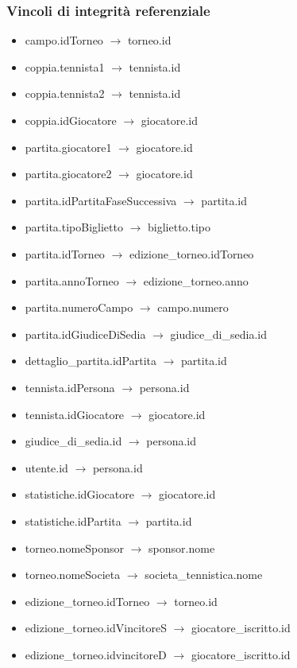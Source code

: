 \documentclass[10pt]{article}
\begin{document}
\subsubsection{Vincoli di integrità referenziale}
\begin{itemize}
    \item campo.idTorneo $\rightarrow$ torneo.id
    \item coppia.tennista1 $\rightarrow$ tennista.id
    \item coppia.tennista2 $\rightarrow$ tennista.id
    \item coppia.idGiocatore $\rightarrow$ giocatore.id
    \item partita.giocatore1 $\rightarrow$ giocatore.id
    \item partita.giocatore2 $\rightarrow$ giocatore.id
    \item partita.idPartitaFaseSuccessiva $\rightarrow$ partita.id
    \item partita.tipoBiglietto $\rightarrow$ biglietto.tipo
    \item partita.idTorneo $\rightarrow$ edizione\_torneo.idTorneo
    \item partita.annoTorneo $\rightarrow$ edizione\_torneo.anno
    \item partita.numeroCampo $\rightarrow$ campo.numero
    \item partita.idGiudiceDiSedia $\rightarrow$ giudice\_di\_sedia.id
    \item dettaglio\_partita.idPartita $\rightarrow$ partita.id
    \item tennista.idPersona $\rightarrow$ persona.id
    \item tennista.idGiocatore $\rightarrow$ giocatore.id
    \item giudice\_di\_sedia.id $\rightarrow$ persona.id
    \item utente.id $\rightarrow$ persona.id
    \item statistiche.idGiocatore $\rightarrow$ giocatore.id
    \item statistiche.idPartita $\rightarrow$ partita.id
    \item torneo.nomeSponsor $\rightarrow$ sponsor.nome
    \item torneo.nomeSocieta $\rightarrow$ societa\_tennistica.nome
    \item edizione\_torneo.idTorneo $\rightarrow$ torneo.id
    \item edizione\_torneo.idVincitoreS $\rightarrow$ giocatore\_iscritto.id
    \item edizione\_torneo.idvincitoreD $\rightarrow$ giocatore\_iscritto.id

\end{itemize}
\end{document}
